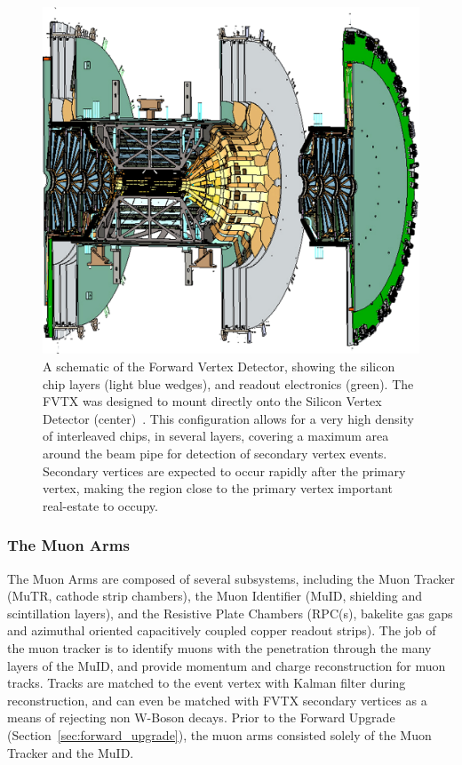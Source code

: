 \begin{figure}[ht]
  \centering
  \includegraphics[width=0.6\linewidth]{./figures/forward_vertex_detector}
  \caption{
    A schematic of the Forward Vertex Detector, showing the silicon chip layers
    (light blue wedges), and readout electronics (green). The FVTX was designed
    to mount directly onto the Silicon Vertex Detector
    (center)~\cite{Aidala2014}.  This configuration allows for a very high
    density of interleaved chips, in several layers, covering a maximum area
    around the beam pipe for detection of secondary vertex events. Secondary
    vertices are expected to occur rapidly after the primary vertex, making the
    region close to the primary vertex important real-estate to occupy.
  } 
  \label{fig:forward_vertex_detector}
\end{figure}

\edithere{}

\clearpage
\subsubsection{The Muon Arms}

The Muon Arms are composed of several subsystems, including the Muon Tracker
(MuTR, cathode strip chambers), the Muon Identifier (MuID, shielding and
scintillation layers), and the Resistive Plate Chambers (RPC(s), bakelite gas
gaps and azimuthal oriented capacitively coupled copper readout strips). The job
of the muon tracker is to identify muons with the penetration through the many
layers of the MuID, and provide momentum and charge reconstruction for muon
tracks. Tracks are matched to the event vertex with Kalman filter during
reconstruction, and can even be matched with FVTX secondary vertices as a means
of rejecting non W-Boson decays. Prior to the Forward Upgrade
(Section~\ref{sec:forward_upgrade}), the muon arms consisted solely of the Muon
Tracker and the MuID. 


